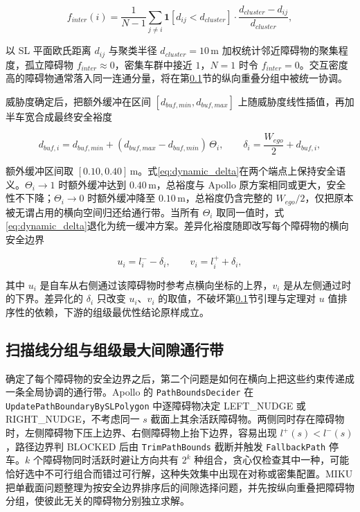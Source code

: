 \documentclass[a4paper,11pt]{ctexart}
\theoremstyle{definition}
\begin{document}
\begin{equation}
    f_{inter}(i) = \frac{1}{N-1} \sum_{j \neq i} \mathbf{1}\!\left[d_{ij} < d_{cluster}\right] \cdot \frac{d_{cluster} - d_{ij}}{d_{cluster}},
    \label{eq:f_inter}
\end{equation}

以 SL 平面欧氏距离 $d_{ij}$ 与聚类半径 $d_{cluster}=10$\,m 加权统计邻近障碍物的聚集程度，孤立障碍物 $f_{inter}\approx 0$，密集车群中接近 $1$，$N=1$ 时令 $f_{inter}=0$。交互密度高的障碍物通常落入同一连通分量，将在第\ref{sec:method_band}节的纵向重叠分组中被统一协调。

威胁度确定后，把额外缓冲在区间 $[d_{buf,min}, d_{buf,max}]$ 上随威胁度线性插值，再加半车宽合成最终安全裕度

\begin{equation}
    d_{buf,i} = d_{buf,min} + (d_{buf,max} - d_{buf,min})\,\Theta_i, \qquad
    \delta_i = \frac{W_{ego}}{2} + d_{buf,i},
    \label{eq:dynamic_delta}
\end{equation}

额外缓冲区间取 $[0.10, 0.40]$\,m。式\eqref{eq:dynamic_delta}在两个端点上保持安全语义。$\Theta_i \to 1$ 时额外缓冲达到 $0.40$\,m，总裕度与 Apollo 原方案相同或更大，安全性不下降；$\Theta_i \to 0$ 时额外缓冲降至 $0.10$\,m，总裕度仍含完整的 $W_{ego}/2$，仅把原本被无谓占用的横向空间归还给通行带。当所有 $\Theta_i$ 取同一值时，式\eqref{eq:dynamic_delta}退化为统一缓冲方案。差异化裕度随即改写每个障碍物的横向安全边界

\begin{equation}
    u_i = l_i^{-} - \delta_i, \qquad v_i = l_i^{+} + \delta_i,
    \label{eq:dynamic_uv}
\end{equation}

其中 $u_i$ 是自车从右侧通过该障碍物时参考点横向坐标的上界，$v_i$ 是从左侧通过时的下界。差异化的 $\delta_i$ 只改变 $u_i$、$v_i$ 的取值，不破坏第\ref{sec:method_band}节引理与定理对 $u$ 值排序性的依赖，下游的组级最优性结论原样成立。

\subsection{扫描线分组与组级最大间隙通行带}
\label{sec:method_band}

确定了每个障碍物的安全边界之后，第二个问题是如何在横向上把这些约束传递成一条全局协调的通行带。Apollo 的 \texttt{PathBoundsDecider} 在 \texttt{UpdatePathBoundaryBySLPolygon} 中逐障碍物决定 LEFT\_NUDGE 或 RIGHT\_NUDGE，不考虑同一 $s$ 截面上其余活跃障碍物。两侧同时存在障碍物时，左侧障碍物下压上边界、右侧障碍物上抬下边界，容易出现 $l^{+}(s)<l^{-}(s)$，路径边界判 BLOCKED 后由 \texttt{TrimPathBounds} 截断并触发 \texttt{FallbackPath} 停车。$k$ 个障碍物同时活跃时避让方向共有 $2^k$ 种组合，贪心仅检查其中一种，可能恰好选中不可行组合而错过可行解，这种失效集中出现在对称或密集配置。MIKU 把单截面问题整理为按安全边界排序后的间隙选择问题，并先按纵向重叠把障碍物分组，使彼此无关的障碍物分别独立求解。
\end{document}
